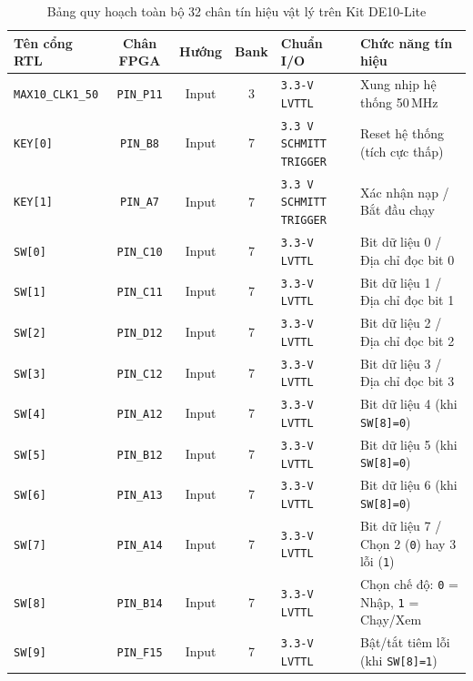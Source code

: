 \documentclass[11pt,a4paper]{report}
\begin{document}
\begin{table}[!htb]
    \centering
    \caption{Bảng quy hoạch toàn bộ 32 chân tín hiệu vật lý trên Kit DE10-Lite}
    \label{tab:pin-assign}
    \scriptsize
    \setlength{\tabcolsep}{3.5pt}
    \renewcommand{\arraystretch}{1.01}
    \begin{tabularx}{\textwidth}{l c c c l X}
        \toprule
        \textbf{Tên cổng RTL} & \textbf{Chân FPGA} & \textbf{Hướng} & \textbf{Bank} & \textbf{Chuẩn I/O} & \textbf{Chức năng tín hiệu} \\
        \midrule
        \texttt{MAX10\_CLK1\_50} & \texttt{PIN\_P11} & Input & 3 & \texttt{3.3-V LVTTL} & Xung nhịp hệ thống 50\,MHz \\
        \texttt{KEY[0]} & \texttt{PIN\_B8} & Input & 7 & \texttt{3.3 V SCHMITT TRIGGER} & Reset hệ thống (tích cực thấp) \\
        \texttt{KEY[1]} & \texttt{PIN\_A7} & Input & 7 & \texttt{3.3 V SCHMITT TRIGGER} & Xác nhận nạp / Bắt đầu chạy \\
        \texttt{SW[0]} & \texttt{PIN\_C10} & Input & 7 & \texttt{3.3-V LVTTL} & Bit dữ liệu 0 / Địa chỉ đọc bit 0 \\
        \texttt{SW[1]} & \texttt{PIN\_C11} & Input & 7 & \texttt{3.3-V LVTTL} & Bit dữ liệu 1 / Địa chỉ đọc bit 1 \\
        \texttt{SW[2]} & \texttt{PIN\_D12} & Input & 7 & \texttt{3.3-V LVTTL} & Bit dữ liệu 2 / Địa chỉ đọc bit 2 \\
        \texttt{SW[3]} & \texttt{PIN\_C12} & Input & 7 & \texttt{3.3-V LVTTL} & Bit dữ liệu 3 / Địa chỉ đọc bit 3 \\
        \texttt{SW[4]} & \texttt{PIN\_A12} & Input & 7 & \texttt{3.3-V LVTTL} & Bit dữ liệu 4 (khi \texttt{SW[8]=0}) \\
        \texttt{SW[5]} & \texttt{PIN\_B12} & Input & 7 & \texttt{3.3-V LVTTL} & Bit dữ liệu 5 (khi \texttt{SW[8]=0}) \\
        \texttt{SW[6]} & \texttt{PIN\_A13} & Input & 7 & \texttt{3.3-V LVTTL} & Bit dữ liệu 6 (khi \texttt{SW[8]=0}) \\
        \texttt{SW[7]} & \texttt{PIN\_A14} & Input & 7 & \texttt{3.3-V LVTTL} & Bit dữ liệu 7 / Chọn 2 (\texttt{0}) hay 3 lỗi (\texttt{1}) \\
        \texttt{SW[8]} & \texttt{PIN\_B14} & Input & 7 & \texttt{3.3-V LVTTL} & Chọn chế độ: \texttt{0} = Nhập, \texttt{1} = Chạy/Xem \\
        \texttt{SW[9]} & \texttt{PIN\_F15} & Input & 7 & \texttt{3.3-V LVTTL} & Bật/tắt tiêm lỗi (khi \texttt{SW[8]=1}) \\

\end{tabularx}
\end{table}
\end{document}
